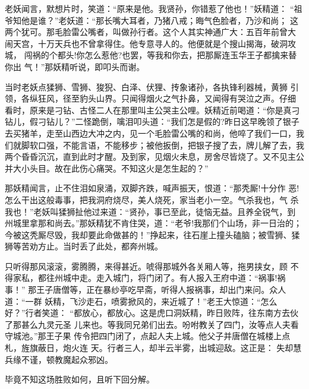 老妖闻言，默想片时，笑道：“原来是他。我贤孙，你错惹了他也！”妖精道：
“祖爷知他是谁？”老妖道：“那长嘴大耳者，乃猪八戒；晦气色脸者，乃沙和尚；
这两个犹可。那毛脸雷公嘴者，叫做孙行者。这个人其实神通广大：五百年前曾大
闹天宫，十万天兵也不曾拿得住。他专意寻人的。他便就是个搜山揭海，破洞攻城，
闯祸的个都头!你怎么惹他?也罢，等我和你去，把那厮连玉华王子都擒来替你出
气！”那妖精听说，即叩头而谢。

当时老妖点猱狮、雪狮、狻猊、白泽、伏狸、抟象诸孙，各执锋利器械，黄狮
引领，各纵狂风，径至豹头山界。只闻得烟火之气扑鼻，又闻得有哭泣之声。仔细
看时，原来是刁钻、古怪二人在那里叫主公哭主公哩。妖精近前喝道：“你是真刁
钻儿，假刁钻儿？”二怪跪倒，噙泪叩头道：“我们怎是假的?昨日这早晚领了银子
去买猪羊，走至山西边大冲之内，见一个毛脸雷公嘴的和尚，他啐了我们一口，我
们就脚软口强，不能言语，不能移步；被他扳倒，把银子搜了去，牌儿解了去，我
两个昏昏沉沉，直到此时才醒。及到家，见烟火未息，房舍尽皆烧了。又不见主公
并大小头目。故在此伤心痛哭。不知这火是怎生起的？”

那妖精闻言，止不住泪如泉涌，双脚齐跌，喊声振天，恨道：“那秃厮!十分作
恶!怎么干出这般毒事，把我洞府烧尽，美人烧死，家当老小一空。气杀我也，气
杀我也！”老妖叫猱狮扯他过来道：“贤孙，事已至此，徒恼无益。且养全锐气，到
州城里拿那和尚去。”那妖精犹不肯住哭，道：“老爷!我那们个山场，非一日治的；
今被这秃厮尽毁，我却要此命做甚的！”挣起来，往石崖上撞头磕脑；被雪狮、猱
狮等苦劝方止。当时丢了此处，都奔州城。

只听得那风滚滚，雾腾腾，来得甚近。唬得那城外各关厢人等，拖男挟女，顾
不得家私，都往州城中走。走入城门，将门闭了。有人报入王府中道：“祸事!祸事！”
那王子唐僧等，正在暴纱亭吃早斋，听得人报祸事，却出门来问。众人道：“一群
妖精，飞沙走石，喷雾掀风的，来近城了！”老王大惊道：“怎么好？”行者笑道：
“都放心，都放心。这是虎口洞妖精，昨日败阵，往东南方去伙了那甚么九灵元圣
儿来也。等我同兄弟们出去。吩咐教关了四门，汝等点人夫看守城池。”那王子果
传令把四门闭了，点起人夫上城。他父子并唐僧在城楼上点札，旌旗蔽日，炮火连
天。行者三人，却半云半雾，出城迎敌。这正是：
失却慧兵缘不谨，顿教魔起众邪凶。

毕竟不知这场胜败如何，且听下回分解。